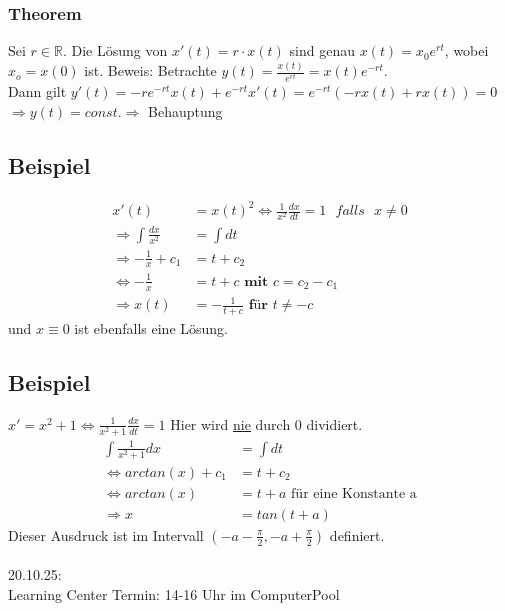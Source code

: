 \documentclass[12pt,a4paper]{article}
\begin{document}
\subsubsection{Theorem}
Sei $r \in \mathbb{R}$. Die Lösung von $x'(t) = r \cdot x(t)$ sind genau $x(t) = x_0e^{rt}$, wobei $x_o = x(0)$ ist.
Beweis: Betrachte $y(t) = \frac{x(t)}{e^{rt}} = x(t) e^{-rt}$. \\
Dann gilt $y'(t) = -re^{-rt}x(t) + e^{-rt}x'(t) = e^{-rt}(-rx(t)+rx(t)) = 0$ \\
$\Rightarrow y(t) = const. \Rightarrow$ Behauptung
\subsection{Beispiel}
\begin{align*}
x'(t) &= x(t)^2 \Leftrightarrow \frac{1}{x^2} \frac{dx}{dt} = 1 \textbf{ } falls \textbf{ } x \neq 0 \\
\Rightarrow \int \frac{dx}{x^2} &= \int dt \\
\Rightarrow -\frac{1}{x} + c_1 &= t + c_2 \\
\Leftrightarrow -\frac{1}{x} &= t+c \textbf{ mit } c = c_2-c_1 \\
\Rightarrow x(t) &= -\frac{1}{t+c} \textbf{ für } t \neq -c
\end{align*}
und $x \equiv 0$ ist ebenfalls eine Lösung.

\subsection{Beispiel}
$x' = x^2 + 1 \Leftrightarrow \frac{1}{x^2+1} \frac{dx}{dt} = 1$ Hier wird \underline{nie} durch 0 dividiert. \\
\begin{align*}
\int \frac{1}{x^2+1} dx &= \int dt \\
\Leftrightarrow arctan(x) + c_1 &= t+c_2 \\
\Leftrightarrow arctan(x) &= t+a \text{ für eine Konstante a}\\
\Rightarrow x &= tan(t+a)
\end{align*}
Dieser Ausdruck ist im Intervall $(-a-\frac{\pi}{2}, -a+\frac{\pi}{2})$ definiert. \\
\\
20.10.25: \\
Learning Center Termin: 14-16 Uhr im ComputerPool \\
\end{document}
